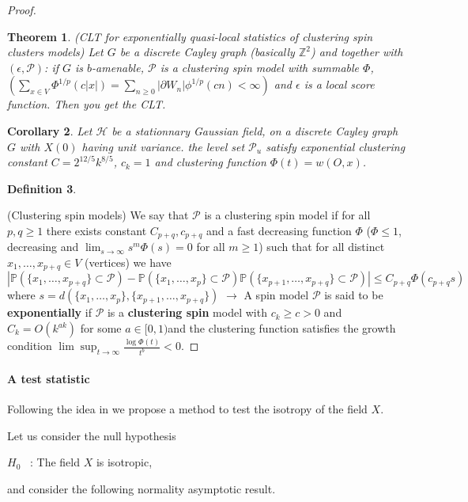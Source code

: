 \documentclass[12pt]{article}
\theoremstyle{Theorem}
\newtheorem{Theorem}{Theorem}[section]
\newtheorem{Corollary}[Theorem]{Corollary}
\newtheorem{Definition}[Theorem]{Definition}
\begin{document}
\begin{proof}
\begin{Theorem}(CLT for exponentially quasi-local statistics of clustering spin clusters models) Let $G$ be a discrete Cayley graph (basically $\mathbb{Z}^{2}$) and together with $(\epsilon, \mathcal{P})$: if $G$ is $b$-amenable, $\mathcal{P}$ is a clustering spin model with summable $\Phi$, $\left(\sum_{x \in V}\Phi^{1/p}(c|x|) = \sum_{n \geq 0} |\partial W_n| \phi^{1/p}(cn) < \infty \right)$ and $\epsilon$ is a local score function. Then you get the CLT.
\end{Theorem}
\begin{Corollary}
Let $\mathcal{H}$ be a stationnary Gaussian field, on a discrete Cayley graph $G$ with $X(0)$ having unit variance. the level set $\mathcal{P}_{u}$ satisfy exponential clustering constant $C = 2^{12/5}k^{8/5}$, $c_{k} = 1$ and clustering function $\Phi(t) = w(O,x)$.
\end{Corollary}
\begin{Definition}
\end{Definition}(Clustering spin models) We say that $\mathcal{P}$ is a clustering spin model if for all $p,q \geq 1$ there exists constant $C_{p+q}, c_{p+q}$ and a fast decreasing function $\Phi$ ($\Phi \leq 1$,  decreasing and $\lim_{s \to \infty}s^{m}\Phi(s) = 0$ for all $m\geq 1$) such that for all distinct $x_{1}, \ldots, x_{p+q} \in V$ (vertices) we have 
$$|\mathbb{P}\left(\{x_{1}, \ldots, x_{p+q}\} \subset \mathcal{P}\right) - \mathbb{P}\left(\{x_{1}, \ldots, x_{p}\}\subset \mathcal{P}\right)\mathbb{P}\left(\{x_{p+1}, \ldots, x_{p+q}\}\subset \mathcal{P}\right)| \leq C_{p+q}\Phi\left(c_{p+q}s\right)$$
where $s = d\left(\{x_{1}, \ldots, x_{p}\}, \{x_{p+1}, \ldots, x_{p+q}\}\right)$
$\rightarrow$ A spin model $\mathcal{P}$ is said to be \textbf{exponentially} if $\mathcal{P}$ is a \textbf{clustering spin} model with $c_{k} \geq c > 0$ and $C_{k} = O(k^{ak})$ for some $a \in [0,1)$and the clustering function satisfies the growth condition $\lim\sup_{t\to \infty}\frac{\log\Phi(t)}{t^{b}} < 0$.
\end{proof}
\paragraph{A test statistic} Following the idea  in \cite{bierme2019}  we propose a method to test the isotropy of the field $X$.

Let us consider the null hypothesis
\begin{center}
  $H_{0}$ \, :\; The field $X$ is isotropic,
\end{center}
and consider the following normality asymptotic result.
\end{document}
